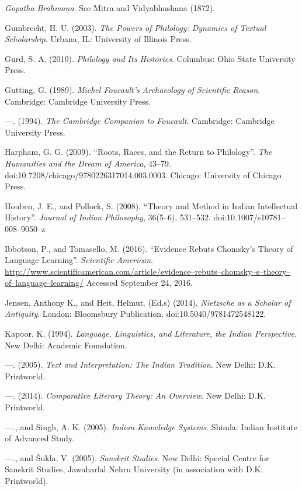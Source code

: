 \begin{thebibliography}{99}
  \textit{Gopatha Brāhmaṇa}. See Mitra and Vidyabhushana (1872).

  Gumbrecht, H. U. (2003). \textit{The Powers of Philology: Dynamics of Textual Scholarship}. Urbana, IL: University of Illinois Press.

  Gurd, S. A. (2010). \textit{Philology and Its Histories}. Columbus: Ohio State University Press.

  Gutting, G. (1989). \textit{Michel Foucault's Archaeology of Scientific Reason}. Cambridge: Cambridge University Press.

  —. (1994). \textit{The Cambridge Companion to Foucault}. Cambridge: Cambridge University Press.

  Harpham, G. G. (2009). “Roots, Races, and the Return to Philology”. \textit{The Humanities and the Dream of America}, 43–79. doi:10.7208/chicago/9780226317014.003.0003. Chicago: University of Chicago Press.

  Houben, J. E., and Pollock, S. (2008). “Theory and Method in Indian Intellectual History”. \textit{Journal of Indian Philosophy}, 36(5–6), 531–532. doi:10.1007/s10781–008–9050–z

  Ibbotson, P., and Tomasello, M. (2016). “Evidence Rebuts Chomsky's Theory of Language Learning”. \textit{Scientific American}. \url{http://www.scientificamerican.com/article/evidence–rebuts–chomsky–s–theory–of–language–learning/} Accessed September 24, 2016.

  Jensen, Anthony K., and Heit, Helmut. (Ed.s) (2014). \textit{Nietzsche as a Scholar of Antiquity}. London: Bloomsbury Publication. doi:10.5040/9781472548122.

  Kapoor, K. (1994). \textit{Language, Linguistics, and Literature, the Indian Perspective}. New Delhi: Academic Foundation.

  —. (2005). \textit{Text and Interpretation: The Indian Tradition}. New Delhi: D.K. Printworld.

  —. (2014). \textit{Comparative Literary Theory: An Overview}. New Delhi: D.K. Printworld.

  —., and Singh, A. K. (2005). \textit{Indian Knowledge Systems}. Shimla: Indian Institute of Advanced Study.

  —., and Śukla, V. (2005). \textit{Sanskrit Studies}. New Delhi: Special Centre for Sanskrit Studies, Jawaharlal Nehru University (in association with D.K. Printworld).


\end{thebibliography}
